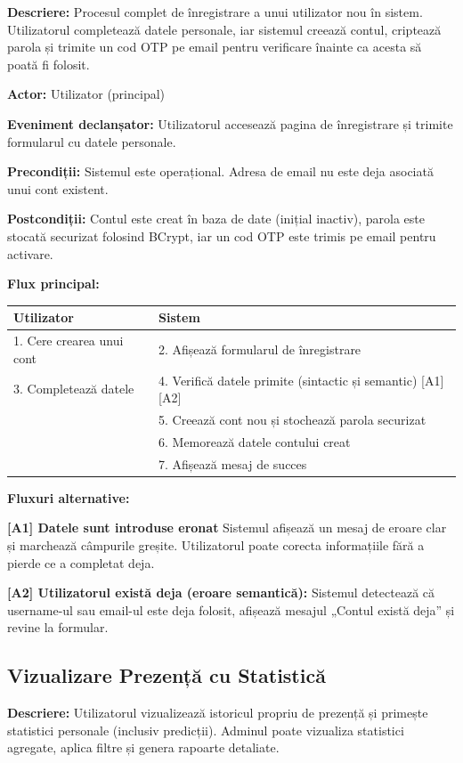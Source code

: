 \documentclass[a4paper,12pt,oneside]{report}
\begin{document}
\textbf{Descriere:} Procesul complet de înregistrare a unui utilizator nou în sistem. Utilizatorul completează datele personale, iar sistemul creează contul, criptează parola și trimite un cod OTP pe email pentru verificare înainte ca acesta să poată fi folosit.

\textbf{Actor:} Utilizator (principal)

\textbf{Eveniment declanșator:} Utilizatorul accesează pagina de înregistrare și trimite formularul cu datele personale.

\textbf{Precondiții:} Sistemul este operațional. Adresa de email nu este deja asociată unui cont existent.

\textbf{Postcondiții:} Contul este creat în baza de date (inițial inactiv), parola este stocată securizat folosind BCrypt, iar un cod OTP este trimis pe email pentru activare.

\textbf{Flux principal:}

\begin{tabular}{l l}
\hline
\textbf{Utilizator} & \textbf{Sistem} \\
\hline
1. Cere crearea unui cont & 2. Afișează formularul de înregistrare \\
3. Completează datele & 4. Verifică datele primite (sintactic și semantic) [A1][A2] \\
 & 5. Creează cont nou și stochează parola securizat \\
 & 6. Memorează datele contului creat \\
 & 7. Afișează mesaj de succes \\
\hline
\end{tabular}

\textbf{Fluxuri alternative:}

\textbf{[A1] Datele sunt introduse eronat}  
Sistemul afișează un mesaj de eroare clar și marchează câmpurile greșite. Utilizatorul poate corecta informațiile fără a pierde ce a completat deja.


\textbf{[A2] Utilizatorul există deja (eroare semantică):}  
Sistemul detectează că username-ul sau email-ul este deja folosit, afișează mesajul „Contul există deja” și revine la formular.

\newpage
\subsection{Vizualizare Prezență cu Statistică}


\textbf{Descriere:} Utilizatorul vizualizează istoricul propriu de prezență și primește statistici personale (inclusiv predicții). Adminul poate vizualiza statistici agregate, aplica filtre și genera rapoarte detaliate.
\end{document}

